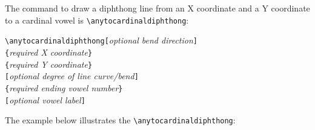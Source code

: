 \documentclass{article}
\begin{document}
The command to draw a diphthong line from an X coordinate and a Y coordinate to a cardinal vowel is \verb|\anytocardinaldiphthong|:

\medskip
\qquad \verb+\anytocardinaldiphthong[+\textit{optional bend direction}\verb+]+\\
\qquad\hspace*{16em} \verb+{+\textit{required X coordinate}\verb+}+\\
\qquad\hspace*{16em} \verb+{+\textit{required Y coordinate}\verb+}+\\
\qquad\hspace*{16em} \verb+[+\textit{optional degree of line curve/bend}\verb+]+\\
\qquad\hspace*{16em} \verb+{+\textit{required ending vowel number}\verb+}+\\
\qquad\hspace*{16em} \verb+[+\textit{optional vowel label}\verb+]+\\
\bigskip

\noindent
The example below illustrates the \verb|\anytocardinaldiphthong|:
\end{document}
